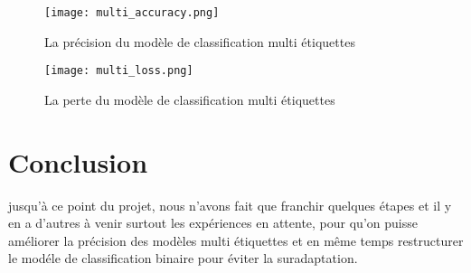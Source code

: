         \begin{figure}[H]
            \centering
            \texttt{[image: multi\_accuracy.png]}
            \caption{La précision du modèle de classification multi étiquettes}\label{fig:multi_accuracy}
        \end{figure}
        
        \begin{figure}[H]
            \centering
            \texttt{[image: multi\_loss.png]}
            \caption{La perte du modèle de classification multi étiquettes}\label{fig:multi_loss}
        \end{figure}
        
        
\section*{Conclusion}
jusqu'à ce point du projet, nous n'avons fait que franchir quelques étapes et il y en a d'autres à venir surtout les expériences en attente, pour qu'on puisse améliorer la précision des modèles multi étiquettes et en même temps restructurer le modéle de classification binaire pour éviter la suradaptation.

